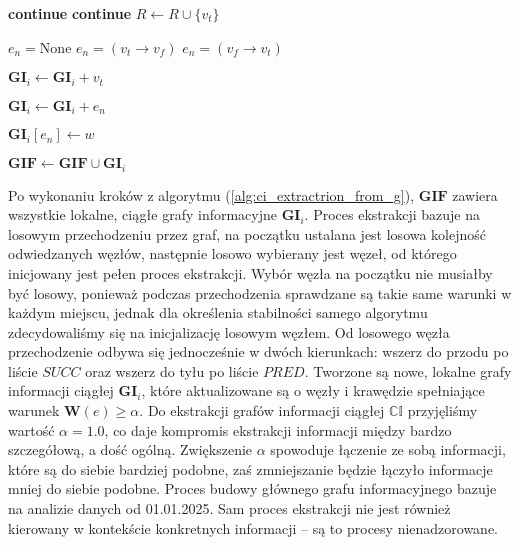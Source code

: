 \begin{algorithm}
\begin{algorithmic}
                    \State \textbf{continue}
                    \State \textbf{continue}
                \Else
                    \State $R \gets R \cup \{ v_t \}$
                \EndIf

                \State $e_n = \text{None}$
                    \State $e_n = (v_t \xrightarrow{} v_f)$
                \Else
                    \State $e_n = (v_f \xrightarrow{} v_t)$
                \EndIf

                    \State $\mathbf{GI}_i \gets \mathbf{GI}_i + v_t$
                \EndIf

                    \State $\mathbf{GI}_i \gets \mathbf{GI}_i + e_n$

                    \State $\mathbf{GI}_i[e_n] \gets w$
                \EndIf
            \EndFor

            \State $\mathbf{GIF} \gets \mathbf{GIF} \cup \mathbf{GI}_i$
            
        \EndWhile
    \end{algorithmic}
\end{algorithm}
Po wykonaniu kroków z algorytmu (\ref{alg:ci_extractrion_from_g}), $\mathbf{GIF}$
zawiera wszystkie lokalne, ciągłe grafy informacyjne $\mathbf{GI}_i$.
Proces ekstrakcji bazuje na losowym przechodzeniu przez graf, na początku ustalana
jest losowa kolejność odwiedzanych węzłów, następnie losowo wybierany jest węzeł,
od którego inicjowany jest pełen proces ekstrakcji. Wybór węzła na początku nie musiałby
być losowy, ponieważ podczas przechodzenia sprawdzane są takie same warunki w każdym
miejscu, jednak dla określenia stabilności samego algorytmu zdecydowaliśmy się
na inicjalizację losowym węzłem. Od losowego węzła przechodzenie odbywa się jednocześnie
w dwóch kierunkach: wszerz do przodu po liście $SUCC$ oraz wszerz do tyłu po liście $PRED$.
Tworzone są nowe, lokalne grafy informacji ciągłej $\mathbf{GI}_i$, które 
aktualizowane są o węzły i krawędzie spełniające warunek $\mathbf{W}(e) \geq \alpha$. 
Do ekstrakcji grafów informacji ciągłej $\mathbb{CI}$ przyjęliśmy wartość $\alpha = 1.0$, 
co daje kompromis ekstrakcji informacji między bardzo szczegółową, a dość ogólną. 
Zwiększenie $\alpha$ spowoduje łączenie ze sobą informacji, które są do siebie bardziej 
podobne, zaś zmniejszanie będzie łączyło informacje mniej do siebie podobne. 
Proces budowy głównego grafu informacyjnego bazuje na analizie danych od 01.01.2025. 
Sam proces ekstrakcji nie jest również kierowany w kontekście konkretnych informacji 
-- są to procesy nienadzorowane.

